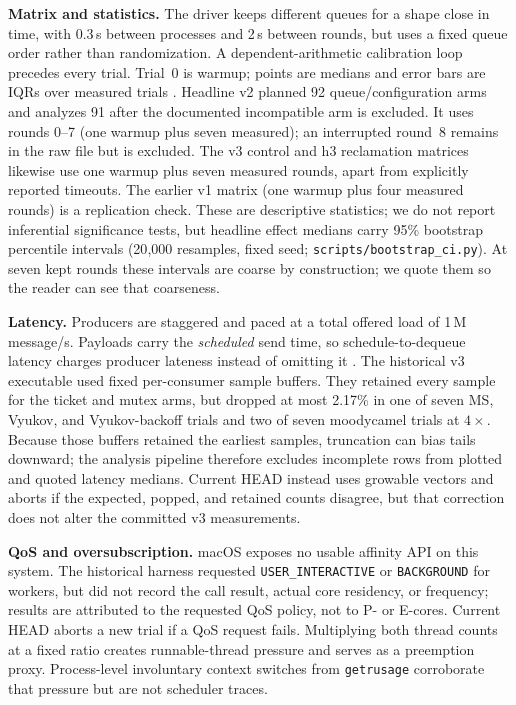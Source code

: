 \documentclass[conference]{IEEEtran}
\begin{document}
\textbf{Matrix and statistics.} The driver keeps different queues for a shape
close in time, with 0.3\,s between processes and 2\,s between rounds, but uses a
fixed queue order rather than randomization. A dependent-arithmetic calibration
loop precedes every trial. Trial~0 is warmup; points are medians and error bars
are IQRs over measured trials \cite{hoefler2015}. Headline v2 planned 92
queue/configuration arms and analyzes 91 after the documented incompatible arm
is excluded. It uses rounds 0--7 (one warmup plus seven measured); an
interrupted round~8 remains in the raw file but is excluded. The v3 control
and h3 reclamation matrices likewise use one warmup plus seven measured rounds,
apart from explicitly reported timeouts. The earlier v1 matrix (one warmup plus
four measured rounds) is a replication check. These are descriptive statistics;
we do not report inferential significance tests, but headline effect medians
carry 95\% bootstrap percentile intervals (20{,}000 resamples, fixed seed;
\texttt{scripts/bootstrap\_ci.py}). At seven kept rounds these intervals are
coarse by construction; we quote them so the reader can see that coarseness.

\textbf{Latency.} Producers are staggered and paced at a total offered load of
1\,M message/s. Payloads carry the \emph{scheduled} send time, so
schedule-to-dequeue latency charges producer lateness instead of omitting it
\cite{tene}. The historical v3 executable used fixed per-consumer sample
buffers. They retained every sample for the ticket and mutex arms, but dropped
at most 2.17\% in one of seven MS, Vyukov, and Vyukov-backoff trials and two of
seven moodycamel trials at $4\times$. Because those buffers retained the
earliest samples, truncation can bias tails downward; the analysis pipeline
therefore excludes incomplete rows from plotted and quoted latency medians.
Current HEAD instead uses growable vectors and aborts if the expected, popped,
and retained counts disagree, but that correction does not alter the committed
v3 measurements.

\textbf{QoS and oversubscription.} macOS exposes no usable affinity API on this
system. The historical harness requested \texttt{USER\_INTERACTIVE} or
\texttt{BACKGROUND} for workers, but did not record the call result, actual core
residency, or frequency; results are attributed to the requested QoS policy,
not to P- or E-cores. Current HEAD aborts a new trial if a QoS request fails.
Multiplying both thread counts at a fixed ratio creates runnable-thread pressure and serves
as a preemption proxy. Process-level involuntary context switches from
\texttt{getrusage} corroborate that pressure but are not scheduler traces.
\end{document}
